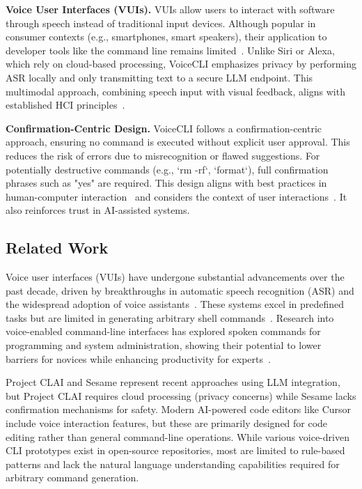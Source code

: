 \documentclass[a4paper,12pt]{article}
\begin{document}
\textbf{Voice User Interfaces (VUIs).} VUIs allow users to interact with software through speech instead of traditional input devices. Although popular in consumer contexts (e.g., smartphones, smart speakers), their application to developer tools like the command line remains limited~\cite{ref7}. Unlike Siri or Alexa, which rely on cloud-based processing, VoiceCLI emphasizes privacy by performing ASR locally and only transmitting text to a secure LLM endpoint. This multimodal approach, combining speech input with visual feedback, aligns with established HCI principles~\cite{ref6}.

\textbf{Confirmation-Centric Design.} VoiceCLI follows a confirmation-centric approach, ensuring no command is executed without explicit user approval. This reduces the risk of errors due to misrecognition or flawed suggestions. For potentially destructive commands (e.g., `rm -rf`, `format`), full confirmation phrases such as "yes" are required. This design aligns with best practices in human-computer interaction~\cite{ref12} and considers the context of user interactions~\cite{ref13}. It also reinforces trust in AI-assisted systems.


\subsection{Related Work}

Voice user interfaces (VUIs) have undergone substantial advancements over the past decade, driven by breakthroughs in automatic speech recognition (ASR) and the widespread adoption of voice assistants~\cite{ref7}. These systems excel in predefined tasks but are limited in generating arbitrary shell commands~\cite{ref4}. Research into voice-enabled command-line interfaces has explored spoken commands for programming and system administration, showing their potential to lower barriers for novices while enhancing productivity for experts~\cite{ref5,ref9}.

Project CLAI and Sesame represent recent approaches using LLM integration, but Project CLAI requires cloud processing (privacy concerns) while Sesame lacks confirmation mechanisms for safety. Modern AI-powered code editors like Cursor include voice interaction features, but these are primarily designed for code editing rather than general command-line operations. While various voice-driven CLI prototypes exist in open-source repositories, most are limited to rule-based patterns and lack the natural language understanding capabilities required for arbitrary command generation.
\end{document}
